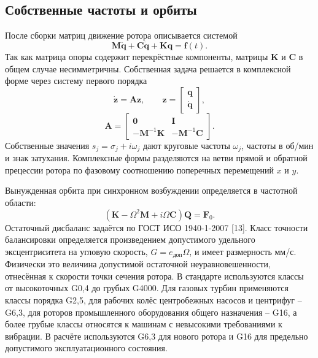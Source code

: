 \documentclass[14pt,a4paper]{extarticle}
\numberwithin{equation}{section}
\numberwithin{figure}{section}
\numberwithin{table}{section}
\begin{document}
\subsection{Собственные частоты и орбиты}

После сборки матриц движение ротора описывается системой
\begin{equation}
    \mathbf{M}\ddot{\mathbf{q}}+\mathbf{C}\dot{\mathbf{q}}+\mathbf{K}\mathbf{q}=\mathbf{f}(t).
    \label{eq:rotor_motion}
\end{equation}
Так как матрица опоры содержит перекрёстные компоненты, матрицы $\mathbf{K}$ и $\mathbf{C}$ в общем случае несимметричны. Собственная задача решается в комплексной форме через систему первого порядка
\begin{equation}
    \dot{\mathbf{z}}=\mathbf{A}\mathbf{z},\qquad
    \mathbf{z}=\begin{bmatrix}\mathbf{q}\\\dot{\mathbf{q}}\end{bmatrix},
\end{equation}
\begin{equation}
    \mathbf{A}=\begin{bmatrix}
    \mathbf{0}&\mathbf{I}\\
    -\mathbf{M}^{-1}\mathbf{K}&-\mathbf{M}^{-1}\mathbf{C}
    \end{bmatrix}.
    \label{eq:first_order_matrix}
\end{equation}
Собственные значения $s_j=\sigma_j+i\omega_j$ дают круговые частоты $\omega_j$, частоты в об/мин и знак затухания. Комплексные формы разделяются на ветви прямой и обратной прецессии ротора по фазовому соотношению поперечных перемещений $x$ и $y$.

Вынужденная орбита при синхронном возбуждении определяется в частотной области:
\begin{equation}
    \left(\mathbf{K}-\Omega^2\mathbf{M}+i\Omega\mathbf{C}\right)\mathbf{Q}=\mathbf{F}_0.
    \label{eq:frequency_response}
\end{equation}
Остаточный дисбаланс задаётся по ГОСТ ИСО 1940-1-2007 [13]. Класс точности балансировки определяется произведением допустимого удельного эксцентриситета на угловую скорость, $G=e_{\text{доп}}\Omega$, и имеет размерность мм/с. Физически это величина допустимой остаточной неуравновешенности, отнесённая к скорости точки сечения ротора. В стандарте используются классы от высокоточных G0,4 до грубых G4000. Для газовых турбин применяются классы порядка G2,5, для рабочих колёс центробежных насосов и центрифуг -- G6,3, для роторов промышленного оборудования общего назначения -- G16, а более грубые классы относятся к машинам с невысокими требованиями к вибрации. В расчёте используются G6,3 для нового ротора и G16 для предельно допустимого эксплуатационного состояния.
\end{document}
